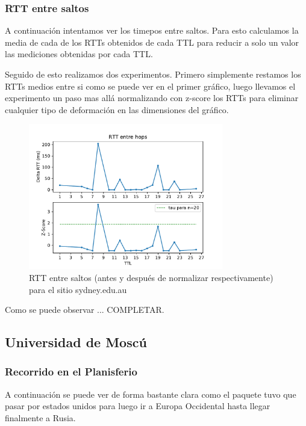 \subsubsection*{RTT entre saltos}

A continuación intentamos ver los timepos entre saltos. Para esto calculamos la media de cada de los RTTs obtenidos de cada TTL para reducir a solo un valor las mediciones obtenidas por cada TTL. 

Seguido de esto realizamos dos experimentos. Primero simplemente restamos los RTTs medios entre si como se puede ver en el primer gráfico, luego llevamos el experimento un paso mas allá normalizando con z-score los RTTs para eliminar cualquier tipo de deformación en las dimensiones del gráfico.

\begin{figure}[H]
  \centering
  \includegraphics[width=8.5cm]{figs/traceroute-sidney.pdf}
  \caption{\normalfont RTT entre saltos (antes y después de normalizar respectivamente) para el sitio sydney.edu.au}
\end{figure}

Como se puede observar ... COMPLETAR.


\subsection*{Universidad de Moscú}

\subsubsection*{Recorrido en el Planisferio}

A continuación se puede ver de forma bastante clara como el paquete tuvo que pasar por estados unidos para luego ir a Europa Occidental hasta llegar finalmente a Rusia.

